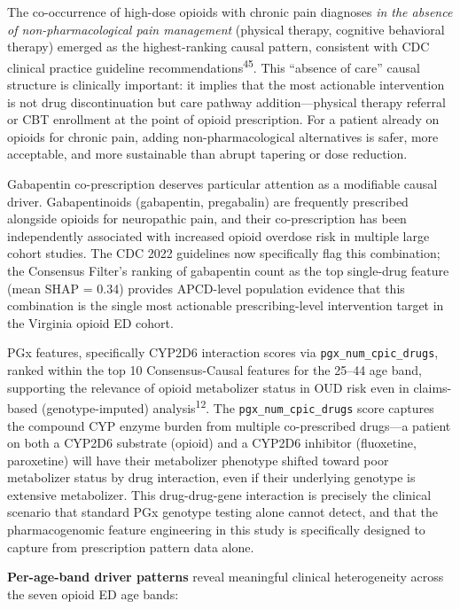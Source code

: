 \documentclass[
  12pt,
]{book}
\begin{document}
The co-occurrence of high-dose opioids with chronic pain diagnoses
\emph{in the absence of non-pharmacological pain management} (physical
therapy, cognitive behavioral therapy) emerged as the highest-ranking
causal pattern, consistent with CDC clinical practice guideline
recommendations\textsuperscript{45}. This ``absence of care'' causal
structure is clinically important: it implies that the most actionable
intervention is not drug discontinuation but care pathway
addition---physical therapy referral or CBT enrollment at the point of
opioid prescription. For a patient already on opioids for chronic pain,
adding non-pharmacological alternatives is safer, more acceptable, and
more sustainable than abrupt tapering or dose reduction.

Gabapentin co-prescription deserves particular attention as a modifiable
causal driver. Gabapentinoids (gabapentin, pregabalin) are frequently
prescribed alongside opioids for neuropathic pain, and their
co-prescription has been independently associated with increased opioid
overdose risk in multiple large cohort studies. The CDC 2022 guidelines
now specifically flag this combination; the Consensus Filter's ranking
of gabapentin count as the top single-drug feature (mean
\textbar SHAP\textbar{} = 0.34) provides APCD-level population evidence
that this combination is the single most actionable prescribing-level
intervention target in the Virginia opioid ED cohort.

PGx features, specifically CYP2D6 interaction scores via
\texttt{pgx\_num\_cpic\_drugs}, ranked within the top 10
Consensus-Causal features for the 25--44 age band, supporting the
relevance of opioid metabolizer status in OUD risk even in claims-based
(genotype-imputed) analysis\textsuperscript{12}. The
\texttt{pgx\_num\_cpic\_drugs} score captures the compound CYP enzyme
burden from multiple co-prescribed drugs---a patient on both a CYP2D6
substrate (opioid) and a CYP2D6 inhibitor (fluoxetine, paroxetine) will
have their metabolizer phenotype shifted toward poor metabolizer status
by drug interaction, even if their underlying genotype is extensive
metabolizer. This drug-drug-gene interaction is precisely the clinical
scenario that standard PGx genotype testing alone cannot detect, and
that the pharmacogenomic feature engineering in this study is
specifically designed to capture from prescription pattern data alone.

\textbf{Per-age-band driver patterns} reveal meaningful clinical
heterogeneity across the seven opioid ED age bands:
\end{document}
